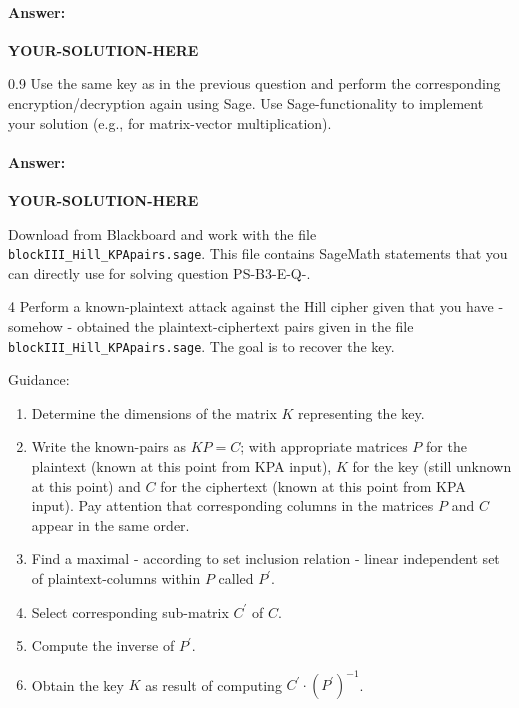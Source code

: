 \documentclass[]{scrartcl}
\newcounter{exercise}
\newcounter{qid}[section]
\newcommand{\exerciseprefix}{prefix}
\newcommand{\questiontitle}{Questions}
\newcommand{\blockid}{B3}
\newcommand{\exname}{}
\newcommand{\yoursolutionhere}{\textbf{YOUR-SOLUTION-HERE}}
\newcommand{\filename}[1]{\texttt{#1}}
\begin{document}
\paragraph{Answer:} \yoursolutionhere{}


\renewcommand{\exerciseprefix}{PS-\blockid{}-E\theexercise: \exname-Q\theqid}
\renewcommand{\questiontitle}{\exerciseprefix{}: Encryption/Decryption in Sage}
\begin{exercisebox}{0.9}
Use the same key as in the previous question and perform the corresponding encryption/decryption again using Sage. Use Sage-functionality to implement your solution (e.g., for matrix-vector multiplication). 
\end{exercisebox}

\paragraph{Answer:} \yoursolutionhere{}

\renewcommand{\questiontitle}{Preparation (!) for question PS-\blockid{}-E\theexercise-Q-\theqid}
\begin{exercisebox}{}
Download from Blackboard and work with the file \filename{blockIII\_Hill\_KPApairs.sage}. This file contains SageMath statements that you can directly use for solving question PS-\blockid{}-E\theexercise-Q-\theqid. 
\end{exercisebox}

\renewcommand{\exerciseprefix}{PS-\blockid{}-E\theexercise: \exname-Q\theqid}
\renewcommand{\questiontitle}{\exerciseprefix{}: Known-plaintext attack}
\begin{exercisebox}{4}
Perform a known-plaintext attack against the Hill cipher given that you have - somehow - obtained the plaintext-ciphertext pairs given in the file \filename{blockIII\_Hill\_KPApairs.sage}. The goal is to recover the key. 

{\small
Guidance:
\begin{enumerate}
    \item Determine the dimensions of the matrix $K$ representing the key. 
    \item Write the known-pairs as $KP=C$; with appropriate matrices $P$ for the plaintext (known at this point from KPA input), $K$ for the key (still unknown at this point) and $C$ for the ciphertext (known at this point from KPA input). Pay attention that corresponding columns in the matrices $P$ and $C$ appear in the same order. 
    \item Find a maximal - according to set inclusion relation - linear independent set of plaintext-columns within $P$ called $P^{\prime}$.
    \item Select corresponding sub-matrix $C^{\prime}$ of $C$. 
    \item Compute the inverse of $P^{\prime}$.
    \item Obtain the key $K$ as result of computing $C^{\prime} \cdot (P^{\prime})^{-1}$. 
\end{enumerate}

}
\end{exercisebox}
\end{document}
